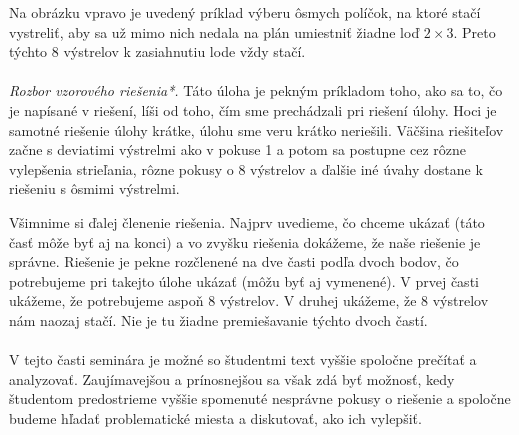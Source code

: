 {{Na obrázku vpravo je uvedený príklad výberu ôsmych políčok, na ktoré stačí vystreliť, aby sa už mimo nich nedala na plán umiestniť žiadne loď $2\times3$. Preto týchto 8 výstrelov k zasiahnutiu lode vždy stačí.\\
\\
\textit{Rozbor vzorového riešenia*.} Táto úloha je pekným príkladom toho, ako sa to, čo je napísané v riešení, líši od toho, čím sme prechádzali pri riešení úlohy. Hoci je samotné riešenie úlohy krátke, úlohu sme veru krátko neriešili. Väčšina riešiteľov začne s deviatimi výstrelmi ako v pokuse 1 a potom sa postupne cez rôzne vylepšenia strieľania, rôzne pokusy o 8 výstrelov a ďalšie iné úvahy dostane k riešeniu s ôsmimi výstrelmi.

Všimnime si ďalej členenie riešenia. Najprv uvedieme, čo chceme ukázať (táto časť môže byť aj na konci) a vo zvyšku riešenia dokážeme, že naše riešenie je správne. Riešenie je pekne rozčlenené na dve časti podľa dvoch bodov, čo potrebujeme pri takejto úlohe ukázať (môžu byť aj vymenené). V prvej časti ukážeme, že potrebujeme aspoň 8 výstrelov. V druhej ukážeme, že 8 výstrelov nám naozaj stačí. Nie je tu žiadne premiešavanie týchto dvoch častí.\\
\\
\kom V tejto časti seminára je možné so študentmi text vyššie spoločne prečítať a analyzovať. Zaujímavejšou a prínosnejšou sa však zdá byť možnosť, kedy študentom predostrieme vyššie spomenuté nesprávne pokusy o riešenie a spoločne budeme hľadať problematické miesta a diskutovať, ako ich vylepšiť.
}




}

